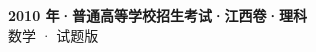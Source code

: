 \documentclass[zihao=-4, a4paper]{ctexart}
\begin{document}
\begin{center}
  {\Large\bfseries 2010 年·普通高等学校招生考试·江西卷·理科}\\[4pt]
  {\large 数学 · 试题版}
\end{center}
\medskip
{}

\end{document}

